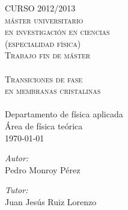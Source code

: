 \begin{titlepage}
\begin{center}


\textsc{\LARGE CURSO 2012/2013}\\[0.5cm]
\textsc{\LARGE máster universitario}\\[0.3cm]
\textsc{\LARGE en investigación en ciencias}\\[0.3cm]
\textsc{\LARGE (especialidad física)}\\[1.5cm]

\textsc{\Large Trabajo fin de máster}\\[0.5cm]

\HRule \\[0.4cm]
\textsc{{ \Huge Transiciones de fase\\[0.3cm] en membranas cristalinas}}\\[0.4cm]
\HRule \\[1.0cm]

{\Large Departamento de física aplicada\\[0.1cm] Área de física teórica}\\[1.6cm]
{\large \today}
\vfill
\begin{minipage}{0.4\textwidth}
\begin{flushleft} \large
\emph{Autor:}\\
Pedro Monroy Pérez
\end{flushleft}
\end{minipage}
\begin{minipage}{0.4\textwidth}
\begin{flushright} \large
\emph{Tutor:} \\
Juan Jesús Ruiz Lorenzo
\end{flushright}
\end{minipage}




\end{center}
\end{titlepage}

